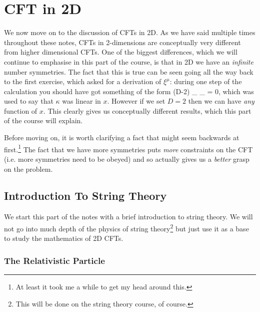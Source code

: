 \chapter{CFT in 2D}

We now move on to the discussion of CFTs in 2D. As we have said multiple times throughout these notes, CFTs in 2-dimensions are conceptually very different from higher dimensional CFTs. One of the biggest differences, which we will continue to emphasise in this part of the course, is that in 2D we have an \textit{infinite} number symmetries. The fact that this is true can be seen going all the way back to the first exercise, which asked for a derivation of $\xi^{\mu}$: during one step of the calculation you should have got something of the form 
\be 
\label{eqn:D-2Kappa}
    (D-2) \p_{\mu} \p_{\nu} \kappa = 0,
\ee 
which was used to say that $\kappa$ was linear in $x$. However if we set $D=2$ then we can have \textit{any} function of $x$. This clearly gives us conceptually different results, which this part of the course will explain. 

Before moving on, it is worth clarifying a fact that might seem backwards at first.\footnote{At least it took me a while to get my head around this.} The fact that we have more symmetries puts \textit{more} constraints on the CFT (i.e. more symmetries need to be obeyed) and so actually gives us a \textit{better} grasp on the problem. 

\section{Introduction To String Theory}

We start this part of the notes with a brief introduction to string theory. We will not go into much depth of the physics of string theory\footnote{This will be done on the string theory course, of course.} but just use it as a base to study the mathematics of 2D CFTs. 

\subsection{The Relativistic Particle}

